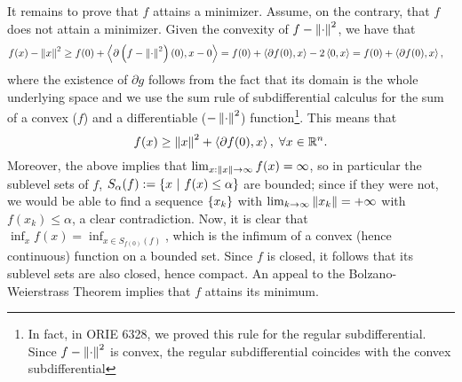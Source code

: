 \documentclass[10pt]{article}
\begin{document}
\begin{Answer}
	It remains to prove that $f$ attains a minimizer. Assume, on the contrary,
	that $f$ does not attain a minimizer. Given the convexity of $f -
	\left \| \cdot \right \|^2$, we have that
	\begin{align*}
		f(x) - \left \| x \right \|^2 &\geq f(0) + \left\langle \partial \left(f - \left \| \cdot \right \|^2
		\right)(0), x - 0 \right\rangle = f(0) + \left\langle \partial f(0), x \right\rangle - 2 \left\langle 0, x \right\rangle =
		f(0) + \left\langle \partial f(0), x \right\rangle,
	\end{align*}
	where the existence of $\partial g$ follows from the fact that its domain
	is the whole underlying space and we use the sum rule of subdifferential
	calculus for the sum of a convex ($f$) and a differentiable
	($-\left \| \cdot \right \|^2$) function\footnote{In fact, in ORIE 6328, we proved this
	rule for the regular subdifferential. Since $f - \left \| \cdot \right \|^2$ is convex,
    the regular subdifferential coincides with the convex subdifferential}.
    This means that
	\[
		f(x) \geq \left \| x \right \|^2 + \left\langle \partial f(0), x \right\rangle, \; \forall x \in \mathbb{R}^n.
	\]
	Moreover, the above implies that $\lim_{x: \left \| x \right \| \to \infty}
	f(x) = \infty$, so in particular the sublevel sets of $f$,
	$S_{\alpha}(f) := \left\{ x \ \middle| \  f(x) \leq \alpha \right\}$ are bounded;
	since if they were not, we would be able to find a sequence $\left\{ x_k \right\}$
	with $\lim_{k \to \infty} \left \| x_k \right \| = +\infty$ with $f(x_k) \leq \alpha$,
	a clear contradiction. Now, it is clear that $\inf_x f(x) = \inf_{x \in
	S_{f(0)}(f)}$, which is the infimum of a convex (hence continuous) function
	on a bounded set. Since $f$ is closed, it follows that its sublevel sets
	are also closed, hence compact. An appeal to the Bolzano-Weierstrass
	Theorem implies that $f$ attains its minimum.
\end{Answer}
\end{document}
